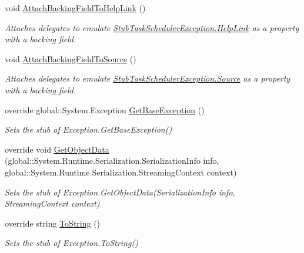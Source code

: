 \begin{DoxyCompactItemize}
void \hyperlink{class_system_1_1_threading_1_1_tasks_1_1_fakes_1_1_stub_task_scheduler_exception_adadf2cb7480ae0ff8221830fe516c232}{Attach\-Backing\-Field\-To\-Help\-Link} ()
\begin{DoxyCompactList}\small\item\em Attaches delegates to emulate \hyperlink{class_system_1_1_threading_1_1_tasks_1_1_fakes_1_1_stub_task_scheduler_exception_ae1222e601df211ed22d58015e0c447ae}{Stub\-Task\-Scheduler\-Exception.\-Help\-Link} as a property with a backing field.\end{DoxyCompactList}\item 
void \hyperlink{class_system_1_1_threading_1_1_tasks_1_1_fakes_1_1_stub_task_scheduler_exception_a37da3bda2173f821afcdf96935663377}{Attach\-Backing\-Field\-To\-Source} ()
\begin{DoxyCompactList}\small\item\em Attaches delegates to emulate \hyperlink{class_system_1_1_threading_1_1_tasks_1_1_fakes_1_1_stub_task_scheduler_exception_a72d0bd7d85b051df2cfc260335d3890d}{Stub\-Task\-Scheduler\-Exception.\-Source} as a property with a backing field.\end{DoxyCompactList}\item 
override global\-::\-System.\-Exception \hyperlink{class_system_1_1_threading_1_1_tasks_1_1_fakes_1_1_stub_task_scheduler_exception_ad00241c68d0cc6b8d038a89d2d01da9a}{Get\-Base\-Exception} ()
\begin{DoxyCompactList}\small\item\em Sets the stub of Exception.\-Get\-Base\-Exception()\end{DoxyCompactList}\item 
override void \hyperlink{class_system_1_1_threading_1_1_tasks_1_1_fakes_1_1_stub_task_scheduler_exception_a4d44c9881658168404eb11e4cef5fc6d}{Get\-Object\-Data} (global\-::\-System.\-Runtime.\-Serialization.\-Serialization\-Info info, global\-::\-System.\-Runtime.\-Serialization.\-Streaming\-Context context)
\begin{DoxyCompactList}\small\item\em Sets the stub of Exception.\-Get\-Object\-Data(\-Serialization\-Info info, Streaming\-Context context)\end{DoxyCompactList}\item 
override string \hyperlink{class_system_1_1_threading_1_1_tasks_1_1_fakes_1_1_stub_task_scheduler_exception_a3b504d548424fdbe7ddd13b1ce21adb1}{To\-String} ()
\begin{DoxyCompactList}\small\item\em Sets the stub of Exception.\-To\-String()\end{DoxyCompactList}\end{DoxyCompactItemize}
